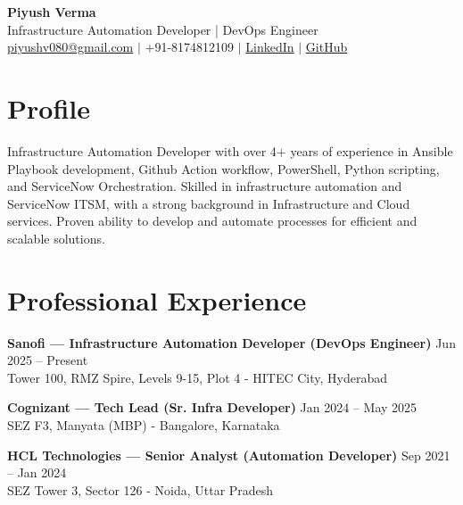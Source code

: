 \documentclass[a4paper,10pt]{article}
\begin{document}
\begin{center}
    {\LARGE \textbf{Piyush Verma}}\\[2pt]
    Infrastructure Automation Developer | DevOps Engineer\\[1pt]
    \href{mailto:piyushv080@gmail.com}{piyushv080@gmail.com} $\vert$ +91-8174812109 $\vert$ 
    \href{https://www.linkedin.com/in/piyushv080/}{LinkedIn} $\vert$ 
    \href{https://github.com/piyushv080}{GitHub}
\end{center}

\section*{Profile}
Infrastructure Automation Developer with over 4+ years of experience in Ansible Playbook development, Github Action workflow, PowerShell, Python scripting, and ServiceNow Orchestration. Skilled in infrastructure automation and ServiceNow ITSM, with a strong background in Infrastructure and Cloud services. Proven ability to develop and automate processes for efficient and scalable solutions.


\setlength{\parindent}{0pt} %

\section*{Professional Experience}

\textbf{Sanofi — Infrastructure Automation Developer (DevOps Engineer)} \hfill Jun 2025 -- Present\\
Tower 100, RMZ Spire, Levels 9-15, Plot 4 - HITEC City, Hyderabad

\vspace{2mm} %

\textbf{Cognizant — Tech Lead (Sr. Infra Developer)} \hfill Jan 2024 -- May 2025\\
SEZ F3, Manyata (MBP) - Bangalore, Karnataka

\vspace{2mm} %

\textbf{HCL Technologies — Senior Analyst (Automation Developer)} \hfill Sep 2021 -- Jan 2024\\
SEZ Tower 3, Sector 126 - Noida, Uttar Pradesh
\end{document}
